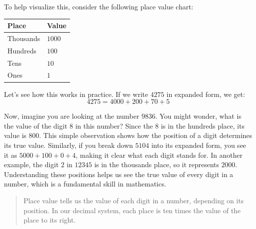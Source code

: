 To help visualize this, consider the following place value chart:

\begin{center}
  \begin{tabular}{ l l }
    \hline
    Place & Value \\
    \hline
    Thousands & \(1000\) \\
    Hundreds  & \(100\) \\
    Tens      & \(10\) \\
    Ones      & \(1\) \\
    \hline
  \end{tabular}
\end{center}

Let's see how this works in practice. If we write \(4275\) in expanded form, we
get:
\[
4275 = 4000 + 200 + 70 + 5
\]

Now, imagine you are looking at the number \(9836\). You might wonder, what is the
value of the digit \(8\) in this number? Since the \(8\) is in the hundreds place,
its value is \(800\). This simple observation shows how the position of a digit
determines its true value. Similarly, if you break down \(5104\) into its expanded
form, you see it as \(5000 + 100 + 0 + 4\), making it clear what each digit stands
for. In another example, the digit \(2\) in \(12345\) is in the thousands place,
so it represents \(2000\). Understanding these positions helps us see the true
value of every digit in a number, which is a fundamental skill in mathematics.

\blockquote{Place value tells us the value of each digit in a number, depending on
its position. In our decimal system, each place is ten times the value of the
place to its right.}







% 
% 
% 
